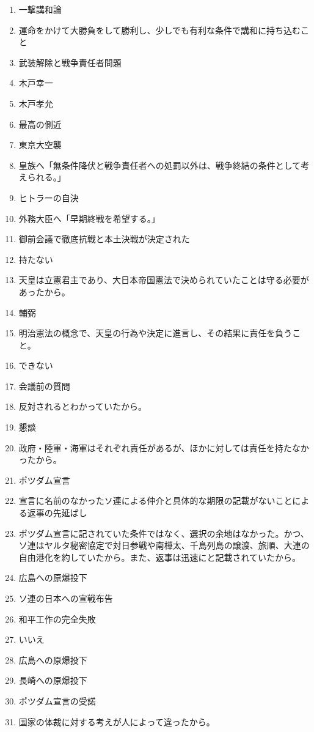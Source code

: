 \documentclass[]{jsarticle}
\begin{document}
\begin{enumerate}
	\item 一撃講和論
	\item 運命をかけて大勝負をして勝利し、少しでも有利な条件で講和に持ち込むこと
		\\
	\item 武装解除と戦争責任者問題
	\item 木戸幸一
	\item 木戸孝允
	\item 最高の側近
	\item 東京大空襲
	\item 皇族へ「無条件降伏と戦争責任者への処罰以外は、戦争終結の条件として考えられる。」
	\item ヒトラーの自決
	\item 外務大臣へ「早期終戦を希望する。」
	\item 御前会議で徹底抗戦と本土決戦が決定された
	\item 持たない
	\item 天皇は立憲君主であり、大日本帝国憲法で決められていたことは守る必要があったから。
	\item 輔弼
	\item 明治憲法の概念で、天皇の行為や決定に進言し、その結果に責任を負うこと。
	\\
	\item できない
	\item 会議前の質問
	\item 反対されるとわかっていたから。
	\item 懇談
	\item 政府・陸軍・海軍はそれぞれ責任があるが、ほかに対しては責任を持たなかったから。
	\item ポツダム宣言
	\item 宣言に名前のなかったソ連による仲介と具体的な期限の記載がないことによる返事の先延ばし
	\item ポツダム宣言に記されていた条件ではなく、選択の余地はなかった。かつ、ソ連はヤルタ秘密協定で対日参戦や南樺太、千島列島の譲渡、旅順、大連の自由港化を約していたから。また、返事は迅速にと記載されていたから。
	\item 広島への原爆投下
	\item ソ連の日本への宣戦布告
	\item 和平工作の完全失敗
	\item いいえ
	\item 広島への原爆投下
	\item 長崎への原爆投下
	\item ポツダム宣言の受諾
	\item 国家の体裁に対する考えが人によって違ったから。

\end{enumerate}
\end{document}
